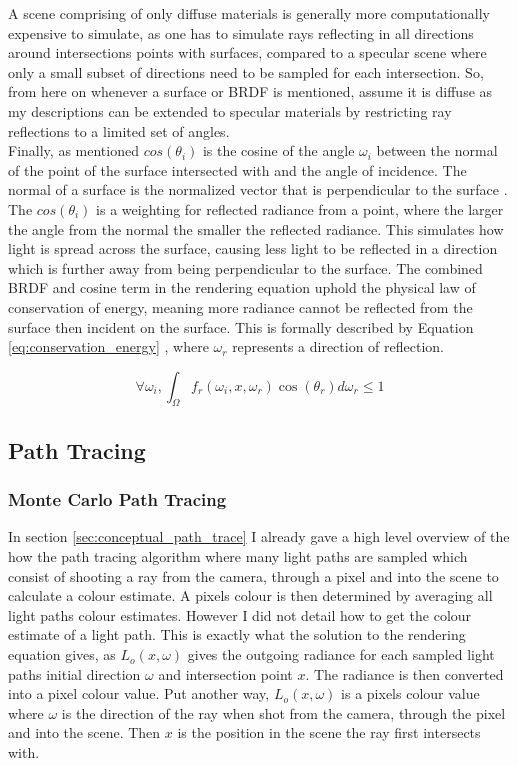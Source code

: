\documentclass[../dissertation.tex]{subfiles}
\begin{document}
A scene comprising of only diffuse materials is generally more computationally expensive to simulate, as one has to simulate rays reflecting in all directions around intersections points with surfaces, compared to a specular scene where only a small subset of directions need to be sampled for each intersection. So, from here on whenever a surface or BRDF is mentioned, assume it is diffuse as my descriptions can be extended to specular materials by restricting ray reflections to a limited set of angles.\\

Finally, as mentioned $cos(\theta_i)$ is the cosine of the angle $\omega_i$ between the normal of the point of the surface intersected with and the angle of incidence. The normal of a surface is the normalized vector that is perpendicular to the surface \cite{normals}. The $cos(\theta_i)$ is a weighting for reflected radiance from a point, where the larger the angle from the normal the smaller the reflected radiance. This simulates how light is spread across the surface, causing less light to be reflected in a direction which is further away from being perpendicular to the surface. The combined BRDF and cosine term in the rendering equation uphold the physical law of conservation of energy, meaning more radiance cannot be reflected from the surface then incident on the surface. This is formally described by Equation \ref{eq:conservation_energy} \cite{glassner2014principles}, where $\omega_r$ represents a direction of reflection.

\begin{equation}
\forall \omega_i, \int_\Omega f_r(\omega_i, x, \omega_r) \cos(\theta_r) d\omega_r \leq 1
\label{eq:conservation_energy}
\end{equation}

\subsection{Path Tracing}

\subsubsection{Monte Carlo Path Tracing}

In section \ref{sec:conceptual_path_trace} I already gave a high level overview of the how the path tracing algorithm where many light paths are sampled which consist of shooting a ray from the camera, through a pixel and into the scene to calculate a colour estimate. A pixels colour is then determined by averaging all light paths colour estimates. However I did not detail how to get the colour estimate of a light path. This is exactly what the solution to the rendering equation gives, as $L_o(x,\omega)$ gives the outgoing radiance for each sampled light paths initial direction $\omega$ and intersection point $x$. The radiance is then converted into a pixel colour value. Put another way, $L_o(x,\omega)$ is a pixels colour value where $\omega$ is the direction of the ray when shot from the camera, through the pixel and into the scene. Then $x$ is the position in the scene the ray first intersects with. \\
\end{document}
